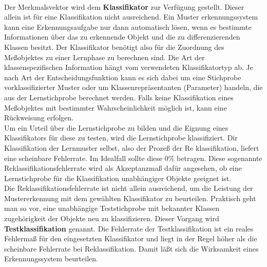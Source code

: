 \paragraph{}
Der Merkmalsvektor wird dem \textbf{Klassifikator} zur Verf\"ugung gestellt.
Dieser allein ist f\"ur eine Klassifikation nicht ausreichend. Ein Muster%
erkennungssystem kann eine Erkennungsaufgabe nur dann automatisch l\"osen,
wenn es bestimmte Informationen \"uber das zu erkennende Objekt und die zu
differenzierenden Klassen besitzt. Der Klassifikator ben\"otigt also f\"ur die
Zuordnung des Me\ss{}objektes zu einer Lernphase zu berechnen sind. Die Art der
klassenspezifischen Information h\"angt vom verwendeten Klassifikatortyp ab. Je
nach Art der Entscheidungsfunktion kann es sich dabei um eine Stichprobe
vorklassifizierter Muster oder um Klassenrepr\"asentanten (Parameter) handeln,
die aus der Lernstichprobe berechnet werden. Falls keine Klassifikation eines
Me\ss{}objektes mit bestimmter Wahrscheinlichkeit m\"oglich ist, kann eine
R\"uckweisung erfolgen.\\
Um ein Urteil \"uber die Lernstichprobe zu bilden und die Eignung eines
Klassifikators f\"ur diese zu testen, wird die Lernstichprobe klassifiziert.
Dir Klassifikation der Lernmuster selbst, also der Proze\ss{} der Re%
klassifikation, liefert eine scheinbare Fehlerrate. Im Idealfall sollte
diese 0\% betragen. Diese sogenannte Reklassifikationsfehlerrate wird als
Akzeptanzma\ss{} daf\"ur angesehen, ob eine Lernstichprobe f\"ur die
Klassifikation unabh\"angiger Objekte geeignet ist.\\
Die Reklassifikationsfehlerrate ist nicht allein ausreichend, um die Leistung
der Mustererkennung mit dem gew\"ahlten Klassifikator zu beurteilen. Praktisch
geht man so vor, eine unabh\"angige Teststichprobe mit bekannter Klassen%
zugeh\"origkeit der Objekte neu zu klassifizieren. Dieser Vorgang wird \textbf{%
Testklassifikation} genannt. Die Fehlerrate der Testklassifikation ist ein
reales Fehlerma\ss{} f\"ur den eingesetzten Klassifikator und liegt in der Regel
h\"oher als die scheinbare Fehlerrate bei Reklassifikation. Damit l\"a\ss{}t
sich die Wirksamkeit eines Erkennungssystem beurteilen.